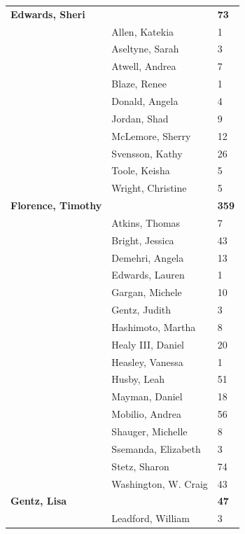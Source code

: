 \documentclass{article}\usepackage[]{graphicx}\usepackage[]{color}
\begin{document}
{\begin{longtable} { >{\raggedright}p{}|p{}p{}}
   \rowcolor[gray]{0.90}\textbf{Edwards, Sheri} &  & \hspace{2cm}\textbf{73} \\ 
   & Allen, Katekia & 1 \\ 
   & Aseltyne, Sarah & 3 \\ 
   & Atwell, Andrea & 7 \\ 
   \rowcolor[gray]{0.90} & Blaze, Renee & 1 \\ 
   \rowcolor[gray]{0.90} & Donald, Angela & 4 \\ 
   \rowcolor[gray]{0.90} & Jordan, Shad & 9 \\ 
   & McLemore, Sherry & 12 \\ 
   & Svensson, Kathy & 26 \\ 
   & Toole, Keisha & 5 \\ 
   \rowcolor[gray]{0.90} & Wright, Christine & 5 \\ 
   \rowcolor[gray]{0.90}\textbf{Florence, Timothy} &  & \hspace{2cm}\textbf{359} \\ 
   \rowcolor[gray]{0.90} & Atkins, Thomas & 7 \\ 
   & Bright, Jessica & 43 \\ 
   & Demehri, Angela & 13 \\ 
   & Edwards, Lauren & 1 \\ 
   \rowcolor[gray]{0.90} & Gargan, Michele & 10 \\ 
   \rowcolor[gray]{0.90} & Gentz, Judith & 3 \\ 
   \rowcolor[gray]{0.90} & Hashimoto, Martha & 8 \\ 
   & Healy III, Daniel & 20 \\ 
   & Heasley, Vanessa & 1 \\ 
   & Husby, Leah & 51 \\ 
   \rowcolor[gray]{0.90} & Mayman, Daniel & 18 \\ 
   \rowcolor[gray]{0.90} & Mobilio, Andrea & 56 \\ 
   \rowcolor[gray]{0.90} & Shauger, Michelle & 8 \\ 
   & Ssemanda, Elizabeth & 3 \\ 
   & Stetz, Sharon & 74 \\ 
   & Washington, W. Craig & 43 \\ 
   \rowcolor[gray]{0.90}\textbf{Gentz, Lisa} &  & \hspace{2cm}\textbf{47} \\ 
   \rowcolor[gray]{0.90} & Leadford, William & 3 \\ 

\end{longtable}}
\end{document}
